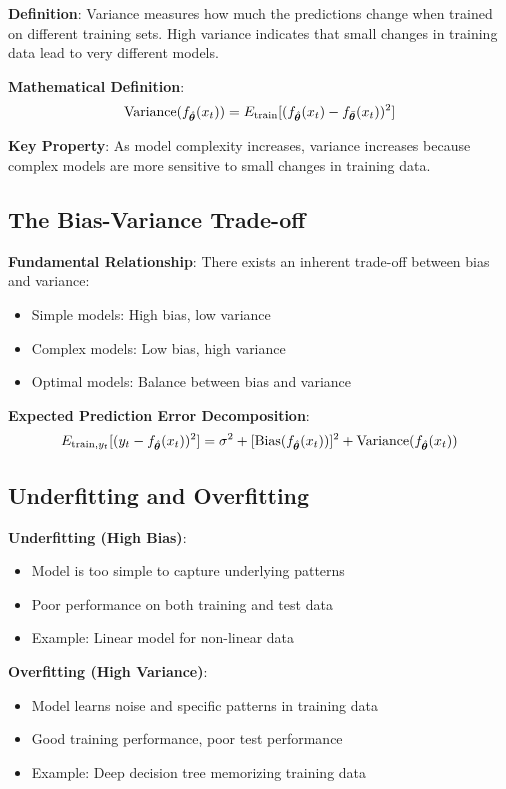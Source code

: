 \documentclass{article}
\begin{document}
\textbf{Definition}: Variance measures how much the predictions change when trained on different training sets. High variance indicates that small changes in training data lead to very different models.

\textbf{Mathematical Definition}:
$$\text{Variance}(f_{\hat{\boldsymbol{\theta}}}(x_t)) = E_{\text{train}}[(f_{\hat{\boldsymbol{\theta}}}(x_t) - f_{\bar{\boldsymbol{\theta}}}(x_t))^2]$$

\textbf{Key Property}: As model complexity increases, variance increases because complex models are more sensitive to small changes in training data.

\subsection{The Bias-Variance Trade-off}

\textbf{Fundamental Relationship}: There exists an inherent trade-off between bias and variance:
\begin{itemize}
    \item Simple models: High bias, low variance
    \item Complex models: Low bias, high variance
    \item Optimal models: Balance between bias and variance
\end{itemize}

\textbf{Expected Prediction Error Decomposition}:
$$E_{\text{train},y_t}[(y_t - f_{\hat{\boldsymbol{\theta}}}(x_t))^2] = \sigma^2 + [\text{Bias}(f_{\hat{\boldsymbol{\theta}}}(x_t))]^2 + \text{Variance}(f_{\hat{\boldsymbol{\theta}}}(x_t))$$

\subsection{Underfitting and Overfitting}

\textbf{Underfitting (High Bias)}:
\begin{itemize}
    \item Model is too simple to capture underlying patterns
    \item Poor performance on both training and test data
    \item Example: Linear model for non-linear data
\end{itemize}

\textbf{Overfitting (High Variance)}:
\begin{itemize}
    \item Model learns noise and specific patterns in training data
    \item Good training performance, poor test performance
    \item Example: Deep decision tree memorizing training data
\end{itemize}
\end{document}
